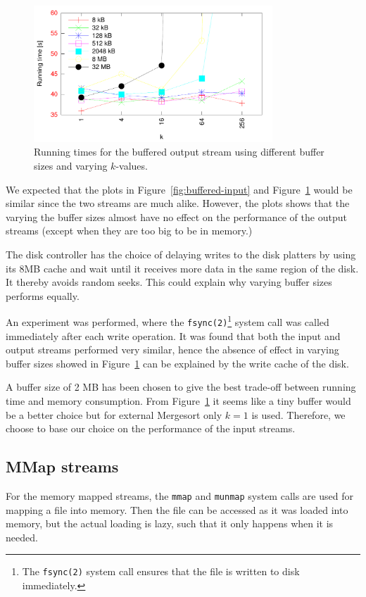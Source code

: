 \documentclass[a4paper,12pt]{article}
\begin{document}
\begin{figure}[h!]
  \centering
  \includegraphics[width=0.8\textwidth]{buffered_output}
  \caption{Running times for the buffered output stream using different
    buffer sizes and varying $k$-values.}
  \label{fig:buffered-output}
\end{figure}

We expected that the plots in Figure~\ref{fig:buffered-input} and
Figure~\ref{fig:buffered-output} would be similar since the two streams
are much alike. However, the plots shows that the varying the buffer sizes
almost have no effect on the performance of the output streams (except
when they are too big to be in memory.)

The disk controller has the choice of delaying writes to the disk platters by using its 8MB cache and wait until it receives more data in the same region of the disk. It thereby avoids random seeks. This could explain why varying buffer sizes performs equally.

An experiment was performed, where the
\texttt{fsync(2)}\footnote{The \texttt{fsync(2)} system call ensures
  that the file is written to disk immediately.} system call was
called immediately after each write operation. It was found that both
the input and output streams performed very similar, hence the absence
of effect in varying buffer sizes showed in
Figure~\ref{fig:buffered-output} can be explained by the write cache of the disk.

A buffer size of 2 MB has been chosen to give the best trade-off
between running time and memory consumption. From
Figure~\ref{fig:buffered-output} it seems like a tiny buffer would be
a better choice but for external Mergesort only $k=1$ is used. Therefore, we choose to base our choice on the performance of the input streams.

\subsection{MMap streams}
For the memory mapped streams, the \texttt{mmap} and \texttt{munmap}
system calls are used for mapping a file into memory. Then the file
can be accessed as it was loaded into memory, but the actual loading
is lazy, such that it only happens when it is needed.
\end{document}
